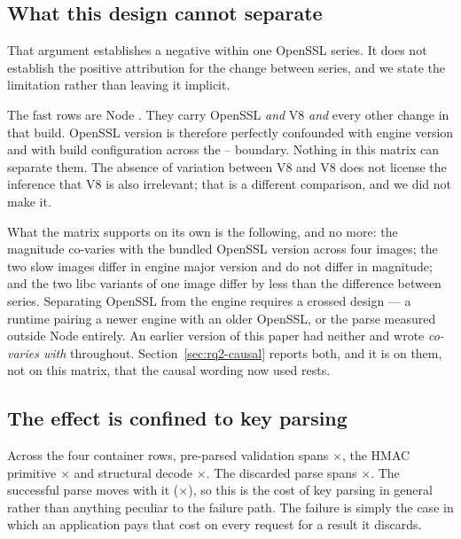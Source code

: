 \documentclass[pdflatex,sn-basic,twocolumn]{sn-jnl}%
\begin{document}
\subsection{What this design cannot separate}\label{sec:cannot-separate}

That argument establishes a negative within one OpenSSL series. It does not
establish the positive attribution for the change between series, and we state
the limitation rather than leaving it implicit.

The fast rows are Node \NodeTwentySixMuslNodeMajor. They carry OpenSSL
\NodeTwentySixMuslOpensslSeries{} \emph{and} V8 \NodeTwentySixMuslVeight{}
\emph{and} every other change in that build. OpenSSL version is therefore
perfectly confounded with engine version and with build configuration across the
\NodeEighteenOpensslSeries--\NodeTwentySixMuslOpensslSeries{} boundary. Nothing
in this matrix can separate them. The absence of variation between V8
\NodeEighteenVeight{} and V8 \NodeTwentyVeight{} does not license the inference
that V8 \NodeTwentySixMuslVeight{} is also irrelevant; that is a different
comparison, and we did not make it.

What the matrix supports on its own is the following, and no more: the
magnitude co-varies with the bundled OpenSSL version across four images; the two
slow images differ in engine major version and do not differ in magnitude; and
the two libc variants of one image differ by less than the difference between
series. Separating OpenSSL from the engine requires a crossed design --- a
runtime pairing a newer engine with an older OpenSSL, or the parse measured
outside Node entirely. An earlier version of this paper had neither and wrote
\emph{co-varies with} throughout. Section~\ref{sec:rq2-causal} reports both,
and it is on them, not on this matrix, that the causal wording now used rests.

\subsection{The effect is confined to key parsing}

Across the four container rows, pre-parsed validation spans
\SpanJwtPreparsed$\times$, the HMAC primitive \SpanHmacString$\times$ and
structural decode \SpanDecodeOnly$\times$. The discarded parse spans
\SpanProbeThrows$\times$. The successful parse moves with it
(\SpanProbeSucceeds$\times$), so this is the cost of key parsing in general
rather than anything peculiar to the failure path. The failure is simply the case
in which an application pays that cost on every request for a result it discards.
\end{document}
